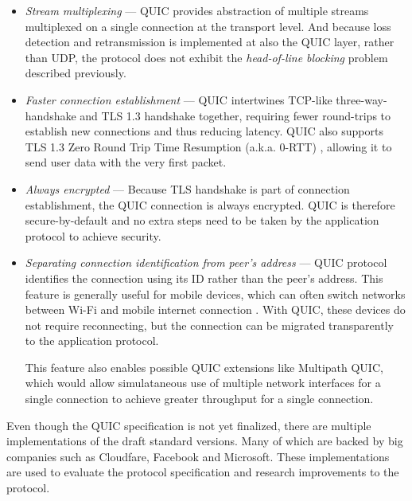 \begin{itemize}
  \item \textit{Stream multiplexing} ---
    QUIC provides abstraction of multiple streams multiplexed on a single connection at the
    transport level. And because loss detection and retransmission is implemented at also the QUIC
    layer, rather than UDP, the protocol does not exhibit the \textit{head-of-line blocking} problem
    described previously.

  \item \textit{Faster connection establishment} ---
    QUIC intertwines TCP-like three-way-handshake and TLS 1.3 handshake together, requiring fewer
    round-trips to establish new connections and thus reducing latency. QUIC also supports TLS 1.3
    Zero Round Trip Time Resumption (a.k.a. 0-RTT) , allowing it to send user data with the very first
    packet.

  \item \textit{Always encrypted} ---
    Because TLS handshake is part of connection establishment, the QUIC connection is always
    encrypted. QUIC is therefore secure-by-default and no extra steps need to be taken by the
    application protocol to achieve security.

  \item \textit{Separating connection identification from peer's address} ---
    QUIC protocol identifies the connection using its ID rather than the peer's address. This
    feature is generally useful for mobile devices, which can often switch networks between Wi-Fi and
    mobile internet connection . With QUIC, these devices do not require
    reconnecting, but the connection can be migrated transparently to the application protocol.

    This feature also enables possible QUIC extensions like Multipath QUIC, which would allow
    simulataneous use of multiple network interfaces for a single connection to achieve greater
    throughput for a single connection. 

\end{itemize}

Even though the QUIC specification is not yet finalized, there are multiple implementations
of the draft standard versions. Many of which are backed by big companies such as Cloudfare,
Facebook and Microsoft. These implementations are used to evaluate the protocol specification and
research improvements to the protocol.

